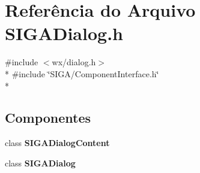 \section{Referência do Arquivo S\+I\+G\+A\+Dialog.\+h}
\label{_s_i_g_a_dialog_8h}
{\ttfamily \#include $<$wx/dialog.\+h$>$}\\*
{\ttfamily \#include \char`\"{}S\+I\+G\+A/\+Component\+Interface.\+h\char`\"{}}\\*
\subsection*{Componentes}
\begin{DoxyCompactItemize}
\item 
class {\bf S\+I\+G\+A\+Dialog\+Content}
\item 
class {\bf S\+I\+G\+A\+Dialog}
\end{DoxyCompactItemize}
